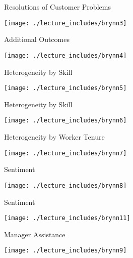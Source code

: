\documentclass{beamer}
\begin{document}
\begin{frame}{Resolutions of Customer Problems}
\begin{center}
\texttt{[image: ./lecture\_includes/brynn3]}
\end{center}
\end{frame}


\begin{frame}{Additional Outcomes}
\begin{center}
\texttt{[image: ./lecture\_includes/brynn4]}
\end{center}
\end{frame}

\begin{frame}{Heterogeneity by Skill}
\begin{center}
\texttt{[image: ./lecture\_includes/brynn5]}
\end{center}
\end{frame}


\begin{frame}{Heterogeneity by Skill}
\begin{center}
\texttt{[image: ./lecture\_includes/brynn6]}
\end{center}
\end{frame}

\begin{frame}{Heterogeneity by Worker Tenure}
\begin{center}
\texttt{[image: ./lecture\_includes/brynn7]}
\end{center}
\end{frame}



\begin{frame}{Sentiment}
\begin{center}
\texttt{[image: ./lecture\_includes/brynn8]}
\end{center}
\end{frame}


\begin{frame}{Sentiment}
\begin{center}
\texttt{[image: ./lecture\_includes/brynn11]}
\end{center}
\end{frame}


\begin{frame}{Manager Assistance}
\begin{center}
\texttt{[image: ./lecture\_includes/brynn9]}
\end{center}
\end{frame}
\end{document}
